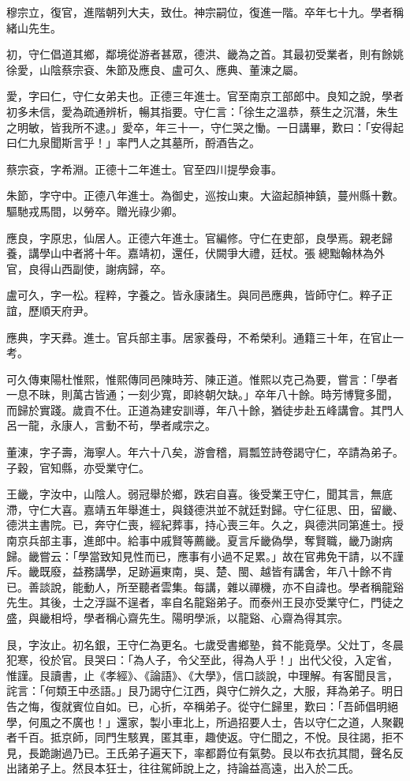 \begin{pinyinscope}
穆宗立，復官，進階朝列大夫，致仕。神宗嗣位，復進一階。卒年七十九。學者稱緒山先生。

初，守仁倡道其鄉，鄰境從游者甚眾，德洪、畿為之首。其最初受業者，則有餘姚徐愛，山陰蔡宗袞、朱節及應良、盧可久、應典、董涷之屬。

愛，字曰仁，守仁女弟夫也。正德三年進士。官至南京工部郎中。良知之說，學者初多未信，愛為疏通辨析，暢其指要。守仁言：「徐生之溫恭，蔡生之沉潛，朱生之明敏，皆我所不逮。」愛卒，年三十一，守仁哭之慟。一日講畢，歎曰：「安得起曰仁九泉聞斯言乎！」率門人之其墓所，酹酒告之。

蔡宗袞，字希淵。正德十二年進士。官至四川提學僉事。

朱節，字守中。正德八年進士。為御史，巡按山東。大盜起顏神鎮，蔓州縣十數。驅馳戎馬間，以勞卒。贈光祿少卿。

應良，字原忠，仙居人。正德六年進士。官編修。守仁在吏部，良學焉。親老歸養，講學山中者將十年。嘉靖初，還任，伏闕爭大禮，廷杖。張總黜翰林為外官，良得山西副使，謝病歸，卒。

盧可久，字一松。程粹，字養之。皆永康諸生。與同邑應典，皆師守仁。粹子正誼，歷順天府尹。

應典，字天彞。進士。官兵部主事。居家養母，不希榮利。通籍三十年，在官止一考。

可久傳東陽杜惟熙，惟熙傳同邑陳時芳、陳正道。惟熙以克己為要，嘗言：「學者一息不昧，則萬古皆通；一刻少寬，即終朝欠缺。」卒年八十餘。時芳博覽多聞，而歸於實踐。歲貢不仕。正道為建安訓導，年八十餘，猶徒步赴五峰講會。其門人呂一龍，永康人，言動不茍，學者咸宗之。

董涷，字子壽，海寧人。年六十八矣，游會稽，肩瓢笠詩卷謁守仁，卒請為弟子。子穀，官知縣，亦受業守仁。

王畿，字汝中，山陰人。弱冠舉於鄉，跌宕自喜。後受業王守仁，聞其言，無底滯，守仁大喜。嘉靖五年舉進士，與錢德洪並不就廷對歸。守仁征思、田，留畿、德洪主書院。已，奔守仁喪，經紀葬事，持心喪三年。久之，與德洪同第進士。授南京兵部主事，進郎中。給事中戚賢等薦畿。夏言斥畿偽學，奪賢職，畿乃謝病歸。畿嘗云：「學當致知見性而已，應事有小過不足累。」故在官弗免干請，以不謹斥。畿既廢，益務講學，足跡遍東南，吳、楚、閩、越皆有講舍，年八十餘不肯已。善談說，能動人，所至聽者雲集。每講，雜以禪機，亦不自諱也。學者稱龍谿先生。其後，士之浮誕不逞者，率自名龍谿弟子。而泰州王艮亦受業守仁，門徒之盛，與畿相埒，學者稱心齋先生。陽明學派，以龍谿、心齋為得其宗。

艮，字汝止。初名銀，王守仁為更名。七歲受書鄉塾，貧不能竟學。父灶丁，冬晨犯寒，役於官。艮哭曰：「為人子，令父至此，得為人乎！」出代父役，入定省，惟謹。艮讀書，止《孝經》、《論語》、《大學》，信口談說，中理解。有客聞艮言，詫言：「何類王中丞語。」艮乃謁守仁江西，與守仁辨久之，大服，拜為弟子。明日告之悔，復就賓位自如。已，心折，卒稱弟子。從守仁歸里，歎曰：「吾師倡明絕學，何風之不廣也！」還家，製小車北上，所過招要人士，告以守仁之道，人聚觀者千百。抵京師，同門生駭異，匿其車，趣使返。守仁聞之，不悅。艮往謁，拒不見，長跪謝過乃已。王氏弟子遍天下，率都爵位有氣勢。艮以布衣抗其間，聲名反出諸弟子上。然艮本狂士，往往駕師說上之，持論益高遠，出入於二氏。


\end{pinyinscope}
